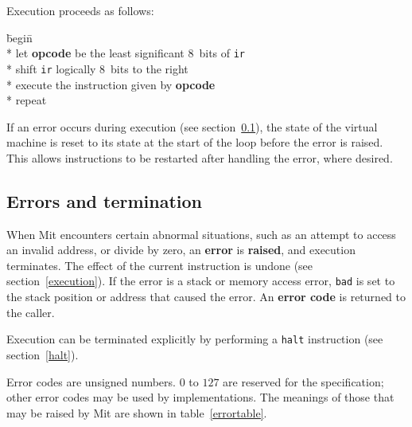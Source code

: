 \documentclass[a4paper]{article}
\newcommand{\instsize}{$8$}
\begin{document}
Execution proceeds as follows:

\begin{tabbing}
\hspace{0.5in}\=begin\=\+\+ \\*
let \textbf{opcode} be the least significant \instsize\ bits of {\tt ir} \\*
shift {\tt ir} logically \instsize\ bits to the right \\*
execute the instruction given by \textbf{opcode} \- \\*
repeat
\end{tabbing}

If an error occurs during execution (see section~\ref{errors}), the state of the virtual machine is reset to its state at the start of the loop before the error is raised. This allows instructions to be restarted after handling the error, where desired.

\subsection{Errors and termination}
\label{errors}

When Mit encounters certain abnormal situations, such as an attempt to access an invalid address, or divide by zero, an {\bf error} is {\bf raised}, and execution terminates. The effect of the current instruction is undone (see section~\ref{execution}). If the error is a stack or memory access error, {\tt bad} is set to the stack position or address that caused the error. An {\bf error code} is returned to the caller.

Execution can be terminated explicitly by performing a {\tt halt} instruction (see section~\ref{halt}).

Error codes are unsigned numbers. $0$ to $127$ are reserved for the specification; other error codes may be used by implementations. The meanings of those that may be raised by Mit are shown in table~\ref{errortable}.
\end{document}
